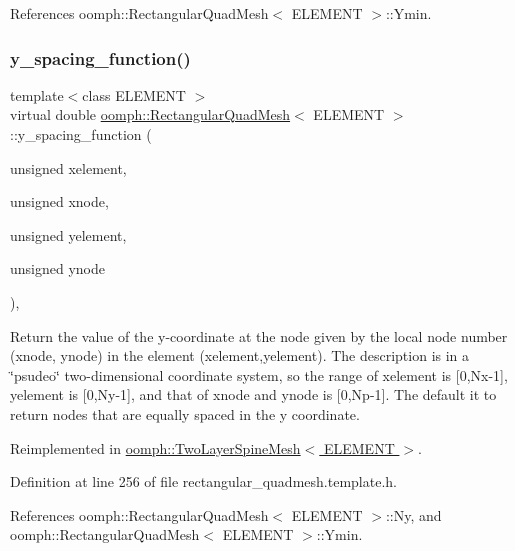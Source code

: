 References oomph\+::\+Rectangular\+Quad\+Mesh$<$ E\+L\+E\+M\+E\+N\+T $>$\+::\+Ymin.

\mbox{\label{classoomph_1_1RectangularQuadMesh_ae78204de1f176cdf2e819673bd34e78a}} 
\subsubsection{\texorpdfstring{y\+\_\+spacing\+\_\+function()}{y\_spacing\_function()}}
{\footnotesize\ttfamily template$<$class E\+L\+E\+M\+E\+NT $>$ \\
virtual double \hyperlink{classoomph_1_1RectangularQuadMesh}{oomph\+::\+Rectangular\+Quad\+Mesh}$<$ E\+L\+E\+M\+E\+NT $>$\+::y\+\_\+spacing\+\_\+function (\begin{DoxyParamCaption}\item[{unsigned}]{xelement,  }\item[{unsigned}]{xnode,  }\item[{unsigned}]{yelement,  }\item[{unsigned}]{ynode }\end{DoxyParamCaption})\hspace{0.3cm}{\ttfamily [inline]}, {\ttfamily [virtual]}}



Return the value of the y-\/coordinate at the node given by the local node number (xnode, ynode) in the element (xelement,yelement). The description is in a \char`\"{}psudeo\char`\"{} two-\/dimensional coordinate system, so the range of xelement is \mbox{[}0,Nx-\/1\mbox{]}, yelement is \mbox{[}0,Ny-\/1\mbox{]}, and that of xnode and ynode is \mbox{[}0,Np-\/1\mbox{]}. The default it to return nodes that are equally spaced in the y coordinate. 



Reimplemented in \hyperlink{classoomph_1_1TwoLayerSpineMesh_a2d05d5228e3831021ab48dd429ada890}{oomph\+::\+Two\+Layer\+Spine\+Mesh$<$ E\+L\+E\+M\+E\+N\+T $>$}.



Definition at line 256 of file rectangular\+\_\+quadmesh.\+template.\+h.



References oomph\+::\+Rectangular\+Quad\+Mesh$<$ E\+L\+E\+M\+E\+N\+T $>$\+::\+Ny, and oomph\+::\+Rectangular\+Quad\+Mesh$<$ E\+L\+E\+M\+E\+N\+T $>$\+::\+Ymin.



